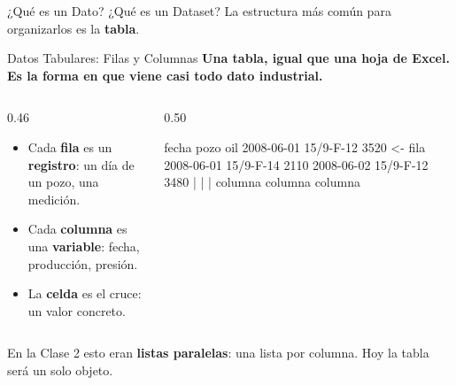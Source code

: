 \documentclass[aspectratio=169, 11pt]{beamer}
\begin{document}
\begin{frame}{¿Qué es un Dato? ¿Qué es un Dataset?}
  \vspace{10pt}
  \centering
  {\footnotesize\color{arcaDark}
    La estructura más común para organizarlos es la \textbf{tabla}.}
\end{frame}

\begin{frame}[fragile,shrink=8]{Datos Tabulares: Filas y Columnas}
  \vspace{-4pt}
  {\small\color{arcaDark}\bfseries
    Una tabla, igual que una hoja de Excel. Es la forma en que viene casi todo dato industrial.}

  \vspace{6pt}
  \begin{columns}[T]
    \begin{column}{0.46\textwidth}
      {\footnotesize\color{textMuted}
      \begin{itemize}\setlength{\itemsep}{6pt}
        \item[{\color{arcaRed}\scriptsize\faArrowRight}]
          Cada \textbf{fila} es un \textbf{registro}:
          un día de un pozo, una medición.
        \item[{\color{arcaRed}\scriptsize\faArrowDown}]
          Cada \textbf{columna} es una \textbf{variable}:
          fecha, producción, presión.
        \item[{\color{arcaRed}\scriptsize\faSquare}]
          La \textbf{celda} es el cruce: un valor concreto.
      \end{itemize}
      }
    \end{column}

    \begin{column}{0.50\textwidth}
      \begin{outputblock}[title={\small\faTable\hspace{6pt}una tabla de producción}]
fecha       pozo       oil
2008-06-01  15/9-F-12  3520   <- fila
2008-06-01  15/9-F-14  2110
2008-06-02  15/9-F-12  3480
   |           |         |
columna     columna   columna
      \end{outputblock}
    \end{column}
  \end{columns}

  \vspace{4pt}
  {\scriptsize\color{textMuted}
    \faLightbulb[regular]\hspace{3pt}%
    En la Clase 2 esto eran \textbf{listas paralelas}: una lista por columna. Hoy la tabla será un solo objeto.}
\end{frame}
\end{document}
